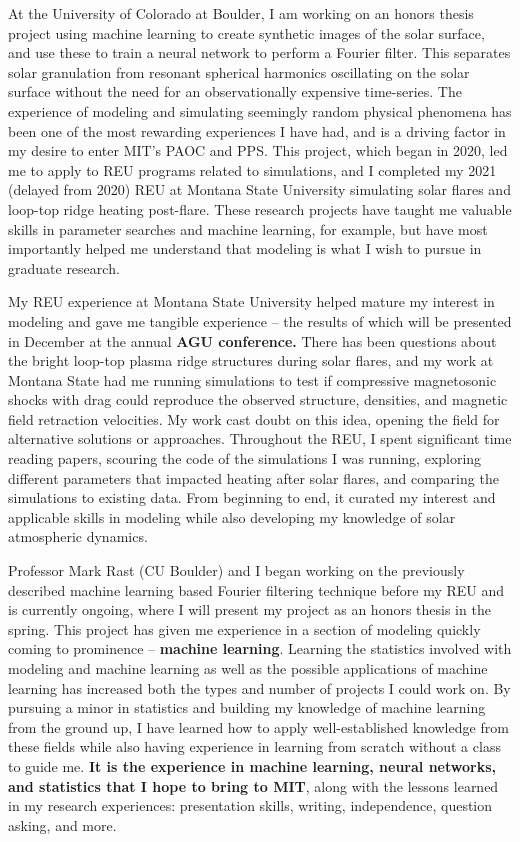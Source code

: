 \documentclass[11pt,letterpaper]{article}
\begin{document}
At the University of Colorado at Boulder, I am working on an honors thesis project using machine learning to create synthetic images of the solar surface, and use these to train a neural network to perform a Fourier filter. This separates solar granulation from resonant spherical harmonics oscillating on the solar surface without the need for an observationally expensive time-series. The experience of modeling and simulating seemingly random physical phenomena has been one of the most rewarding experiences I have had, and is a driving factor in my desire to enter MIT's PAOC and PPS. This project, which began in 2020, led me to apply to REU programs related to simulations, and I completed my 2021 (delayed from 2020) REU at Montana State University simulating solar flares and loop-top ridge heating post-flare. These research projects have taught me valuable skills in parameter searches and machine learning, for example, but have most importantly helped me understand that modeling is what I wish to pursue in graduate research.
 
My REU experience at Montana State University helped mature my interest in modeling and gave me tangible experience – the results of which will be presented in December at the annual \textbf{AGU conference.} There has been questions about the bright loop-top plasma ridge structures during solar flares, and my work at Montana State had me running simulations to test if compressive magnetosonic shocks with drag could reproduce the observed structure, densities, and magnetic field retraction velocities. My work cast doubt on this idea, opening the field for alternative solutions or approaches. Throughout the REU, I spent significant time reading papers, scouring the code of the simulations I was running, exploring different parameters that impacted heating after solar flares, and comparing the simulations to existing data. From beginning to end, it curated my interest and applicable skills in modeling while also developing my knowledge of solar atmospheric dynamics. 

Professor Mark Rast (CU Boulder) and I began working on the previously described machine learning based Fourier filtering technique before my REU and is currently ongoing, where I will present my project as an honors thesis in the spring. This project has given me experience in a section of modeling quickly coming to prominence -- \textbf{machine learning}. Learning the statistics involved with modeling and machine learning as well as the possible applications of machine learning has increased both the types and number of projects I could work on. By pursuing a minor in statistics and building my knowledge of machine learning from the ground up, I have learned how to apply well-established knowledge from these fields while also having experience in learning from scratch without a class to guide me. \textbf{It is the experience in machine learning, neural networks, and statistics that I hope to bring to MIT}, along with the lessons learned in my research experiences: presentation skills, writing, independence, question asking, and more.
\end{document}
